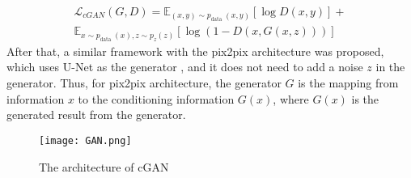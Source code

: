 \documentclass{article}
\begin{document}
\begin{multline}\label{Original_cGAN_Loss}
\mathcal{L}_{c G A N}(G, D)=\mathbb{E}_{(x, y) \sim p_{\text {data }}(x, y)}[\log D(x, y)]+ \\ 
\mathbb{E}_{x \sim p_{\text {data }}(x), z \sim p_z(z)}[\log (1-D(x, G(x, z)))]
\end{multline}
After that, a similar framework with the pix2pix architecture \cite{1-3-isola2017image} was proposed, which uses U-Net as the generator \cite{3-2-Unet-ronneberger2015u}, and it does not need to add a noise $z$ in the generator. Thus, for pix2pix architecture, the generator $G$ is the mapping from information $x$ to the conditioning information $G(x)$, where $G(x)$ is the generated result from the generator.
\begin{figure*} 
    \centering
    \texttt{[image: GAN.png]}
    \caption{The architecture of cGAN}
    \label{fig::cGAN}
\end{figure*}
\end{document}
